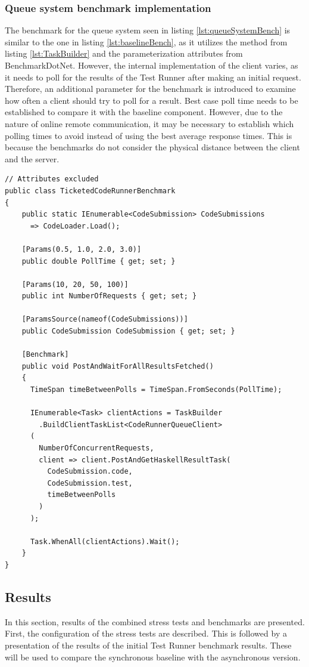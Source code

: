 \subsubsection{Queue system benchmark implementation}
The benchmark for the queue system seen in listing \ref{lst:queueSystemBench} is similar to the one in listing \ref{lst:baselineBench}, as it utilizes the method from listing \ref{lst:TaskBuilder} and the parameterization attributes from BenchmarkDotNet.
However, the internal implementation of the client varies, as it needs to poll for the results of the Test Runner after making an initial request.
Therefore, an additional parameter for the benchmark is introduced to examine how often a client should try to poll for a result.
Best case poll time needs to be established to compare it with the baseline component.
However, due to the nature of online remote communication, it may be necessary to establish which polling times to avoid instead of using the best average response times.
This is because the benchmarks do not consider the physical distance between the client and the server.
\begin{lstlisting}[language=CSharp, escapechar=~, caption={C\# code showing the benchmark implementation for the asynchronous backend}, label={lst:queueSystemBench}]
// Attributes excluded
public class TicketedCodeRunnerBenchmark
{
    public static IEnumerable<CodeSubmission> CodeSubmissions
      => CodeLoader.Load();

    [Params(0.5, 1.0, 2.0, 3.0)]
    public double PollTime { get; set; }

    [Params(10, 20, 50, 100)]
    public int NumberOfRequests { get; set; }

    [ParamsSource(nameof(CodeSubmissions))]
    public CodeSubmission CodeSubmission { get; set; }

    [Benchmark]
    public void PostAndWaitForAllResultsFetched()
    {
      TimeSpan timeBetweenPolls = TimeSpan.FromSeconds(PollTime);

      IEnumerable<Task> clientActions = TaskBuilder
        .BuildClientTaskList<CodeRunnerQueueClient>
      (
        NumberOfConcurrentRequests,
        client => client.PostAndGetHaskellResultTask(
          CodeSubmission.code,
          CodeSubmission.test,
          timeBetweenPolls
        )
      );

      Task.WhenAll(clientActions).Wait();
    }
}
\end{lstlisting}

\subsection{Results}
In this section, results of the combined stress tests and benchmarks are presented.
First, the configuration of the stress tests are described.
This is followed by a presentation of the results of the initial Test Runner benchmark results.
These will be used to compare the synchronous baseline with the asynchronous version.

